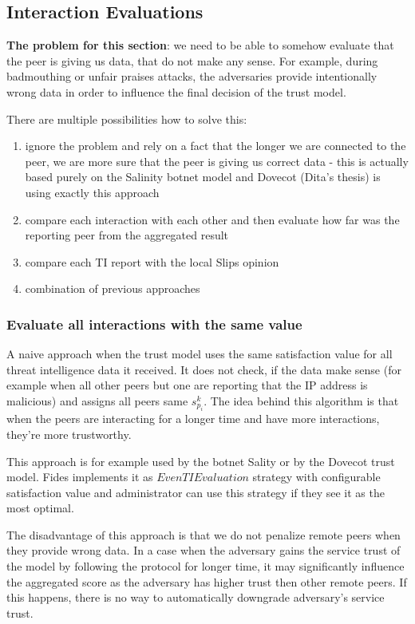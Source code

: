 \subsection{Interaction Evaluations}

\textbf{The problem for this section}: we need to be able to somehow evaluate that the peer is giving us data, that do not make any sense. 
For example, during badmouthing or unfair praises attacks, the adversaries provide intentionally wrong data in order to influence the final decision of the trust model.

There are multiple possibilities how to solve this:
\begin{enumerate}
\item ignore the problem and rely on a fact that the longer we are connected to the peer, we are more sure that the peer is giving us correct data - this is actually based purely on the Salinity botnet model and Dovecot (Dita's thesis) is using exactly this approach
\item compare each interaction with each other and then evaluate how far was the reporting peer from the aggregated result
\item compare each TI report with the local Slips opinion 
\item combination of previous approaches
\end{enumerate}


\subsubsection{Evaluate all interactions with the same value}
A naive approach when the trust model uses the same satisfaction value for all threat intelligence data it received. It does not check, if the data make sense (for example when all other peers but one are reporting that the IP address is malicious) and assigns all peers same $s^{k}_{p_i}$. The idea behind this algorithm is that when the peers are interacting for a longer time and have more interactions, they're more trustworthy.

This approach is for example used by the botnet Sality or by the Dovecot trust model. Fides implements it as $EvenTIEvaluation$ strategy with configurable satisfaction value and administrator can use this strategy if they see it as the most optimal.

The disadvantage of this approach is that we do not penalize remote peers when they provide wrong data. In a case when the adversary gains the service trust of the model by following the protocol for longer time, it may significantly influence the aggregated score as the adversary has higher trust then other remote peers. If this happens, there is no way to automatically downgrade adversary's service trust.

